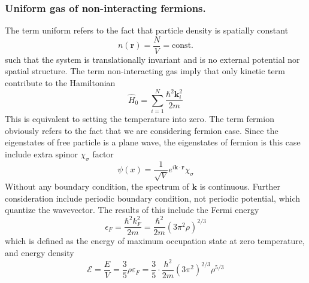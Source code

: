\documentclass[../../../main.tex]{subfiles}
\begin{document}
\subsubsection{Uniform gas of non-interacting fermions.}
The term uniform refers to  the fact that particle density is spatially constant
\begin{equation*}
  n (\mathbf{r }  ) = \frac{N }{V }= \text{const.}
\end{equation*}
such that the system is translationally invariant and is no external potential nor spatial structure.
The term non-interacting gas imply that only kinetic term contribute to the Hamiltonian
\begin{equation*}
  \hat{H}_0 = \sum_{i=1}^{N} \frac{\hbar ^2 \mathbf{k }_i ^{2 }}{2m}
\end{equation*}
This is equivalent to setting the temperature into zero.
The term fermion obviously refers to the fact that we are considering fermion case.
Since the eigenstates of free particle is a plane wave, the eigenstates of fermion is this case include extra spinor $\chi_\sigma$ factor
\begin{equation*}
  \psi(x) = \frac{1}{\sqrt{V}} e^{i \mathbf{k } \cdot \mathbf{r}} \chi_\sigma
\end{equation*}
Without any boundary condition, the spectrum of $\mathbf{k }$ is continuous.
Further consideration include periodic boundary condition, not periodic potential, which quantize the wavevector.
The results of this include the Fermi energy
\begin{equation*}
  \epsilon_F = \frac{\hbar^2 k_F^2}{2m} = \frac{\hbar^2 }{2m} \left( 3\pi^2 \rho \right)^{2/3}
\end{equation*}
which is defined as the energy of maximum occupation state at zero temperature, and energy density
\begin{equation*}
  \mathcal{E} = \frac{E}{V} = \frac{3}{5} \rho \varepsilon_F = \frac{3}{5} \cdot \frac{h^2}{2m} \left( 3\pi^2 \right)^{2/3} \rho^{5/3}
\end{equation*}
\end{document}
